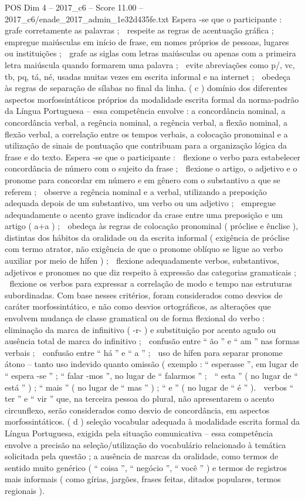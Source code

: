 \begin{textsample}{POS Dim 4 – 2017\_c6 – Score 11.00 – 2017\_c6/enade\_2017\_admin\_1e32d435fe.txt}
Espera -se que o participante :  grafe corretamente as palavras ;  respeite as regras de acentuação gráfica ;  empregue maiúsculas em início de frase, em nomes próprios de pessoas, lugares ou instituições ;  grafe as siglas com letras maiúsculas ou apenas com a primeira letra maiúscula quando formarem uma palavra ;  evite abreviações como p/, vc, tb, pq, tá, né, usadas muitas vezes em escrita informal e na internet ;  obedeça às regras de separação de sílabas no final da linha. ( c ) domínio dos diferentes aspectos morfossintáticos próprios da modalidade escrita formal da norma-padrão da Língua Portuguesa – essa competência envolve : a concordância nominal, a concordância verbal, a regência nominal, a regência verbal, a flexão nominal, a flexão verbal, a correlação entre os tempos verbais, a colocação pronominal e a utilização de sinais de pontuação que contribuam para a organização lógica da frase e do texto.
Espera -se que o participante :  flexione o verbo para estabelecer concordância de número com o sujeito da frase ;  flexione o artigo, o adjetivo e o pronome para concordar em número e em gênero com o substantivo a que se referem ;  observe a regência nominal e a verbal, utilizando a preposição adequada depois de um substantivo, um verbo ou um adjetivo ;  empregue adequadamente o acento grave indicador da crase entre uma preposição e um artigo ( a+a ) ;  obedeça às regras de colocação pronominal ( próclise e ênclise ), distintas dos hábitos da oralidade ou da escrita informal ( exigência de próclise com termo atrator, não exigência de que o pronome oblíquo se ligue ao verbo auxiliar por meio de hífen ) ;  flexione adequadamente verbos, substantivos, adjetivos e pronomes no que diz respeito à expressão das categorias gramaticais ;  flexione os verbos para expressar a correlação de modo e tempo nas estruturas subordinadas.
Com base nesses critérios, foram considerados como desvios de caráter morfossintático, e não como desvios ortográficos, as alterações que envolvem mudança de classe gramatical ou de forma flexional do verbo :  eliminação da marca de infinitivo ( -r- ) e substituição por acento agudo ou ausência total de marca do infinitivo ;  confusão entre “ ão ” e “ am ” nas formas verbais ;  confusão entre “ há ” e “ a ” ;  uso de hífen para separar pronome átono – tanto uso indevido quanto omissão ( exemplo : “ esperasse ”, em lugar de “ espera -se ” ; “ falar -mos ”, no lugar de “ falarmos ” ;  “ esta ” ( no lugar de “ está ” ) ; “ mais ” ( no lugar de “ mas ” ) ; “ e ” ( no lugar de “ é ” ).  verbos “ ter ” e “ vir ” que, na terceira pessoa do plural, não apresentarem o acento circunflexo, serão considerados como desvio de concordância, em aspectos morfossintáticos. ( d ) seleção vocabular adequada à modalidade escrita formal da Língua Portuguesa, exigida pela situação comunicativa – essa competência envolve a precisão na seleção/utilização do vocabulário relacionado à temática solicitada pela questão ; a ausência de marcas da oralidade, como termos de sentido muito genérico ( “ coisa ”, “ negócio ”, “ você ” ) e termos de registros mais informais ( como gírias, jargões, frases feitas, ditados populares, termos regionais ).

\end{textsample}
